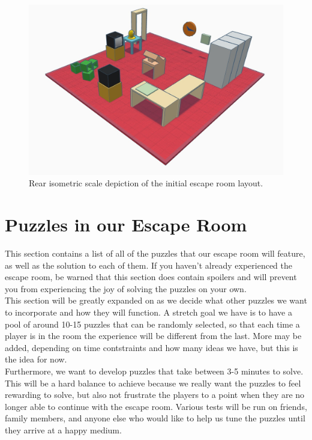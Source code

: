 \documentclass[conference]{IEEEtran}
\begin{document}
\begin{figure}[ht]
    \centering
    \includegraphics[width=0.75\columnwidth]{Images/EscapeRoomIsoRear.jpg}
    \caption{Rear isometric scale depiction of the initial escape room layout.}
\end{figure}


\section{Puzzles in our Escape Room}
This section contains a list of all of the puzzles that our escape room will feature, as well as
the solution to each of them. If you haven't already experienced the escape room, be warned that
this section does contain spoilers and will prevent you from experiencing the joy of solving the
puzzles on your own.
\\


\indent This section will be greatly expanded on as we decide what other puzzles we want to incorporate and how they will function.
A stretch goal we have is to have a pool of around 10-15 puzzles that can be randomly selected, so that each time a player is in the
room the experience will be different from the last. More may be added, depending on time contstraints and how many ideas we
have, but this is the idea for now.
\\
\indent Furthermore, we want to develop puzzles that take between 3-5 minutes to solve. This will be a hard balance
to achieve because we really want the puzzles to feel rewarding to solve, but also not frustrate the players
to a point when they are no longer able to continue with the escape room. Various tests will be run on friends, family members,
and anyone else who would like to help us tune the puzzles until they arrive at a happy medium.
\end{document}
